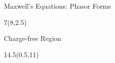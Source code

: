 \begin{lesson33}
\begin{frame}{Maxwell's Equations: Phasor Forms}
\begin{textblock}{7}(8,2.5)
\begin{myblock}[0.9]{Charge-free Region}
\begin{small}
\end{small}
\end{myblock}
\end{textblock}

\begin{textblock}{14.5}(0.5,11)



\end{textblock}
\end{frame}


\end{lesson33}

